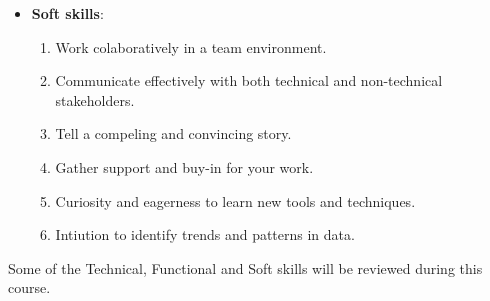 \documentclass[12pt]{report}
\theoremstyle{largebreak}
\begin{document}
\begin{itemize}
        \item \textbf{Soft skills}:
        \begin{enumerate}[label = \textit{(\arabic*)}]
            \item Work colaboratively in a team environment.
            \item Communicate effectively with both technical and non-technical stakeholders.
            \item Tell a compeling and convincing story.
            \item Gather support and buy-in for your work.
            \item Curiosity and eagerness to learn new tools and techniques.
            \item Intiution to identify trends and patterns in data.
        \end{enumerate}
    \end{itemize}

    Some of the Technical, Functional and Soft skills will be reviewed during this course.
\end{document}
